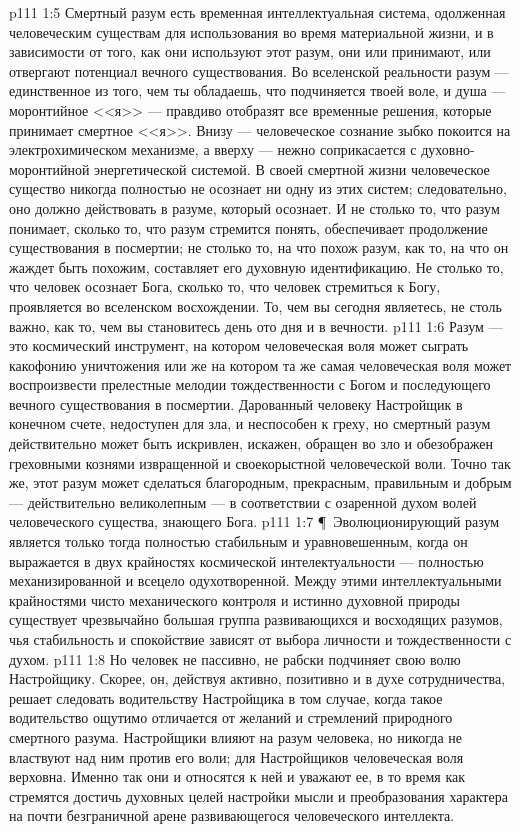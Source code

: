 \vs p111 1:5 Смертный разум есть временная интеллектуальная система, одолженная человеческим существам для использования во время материальной жизни, и в зависимости от того, как они используют этот разум, они или принимают, или отвергают потенциал вечного существования. Во вселенской реальности разум --- единственное из того, чем ты обладаешь, что подчиняется твоей воле, и душа --- моронтийное <<я>> --- правдиво отобразят все временные решения, которые принимает смертное <<я>>. Внизу --- человеческое сознание зыбко покоится на электрохимическом механизме, а вверху --- нежно соприкасается с духовно\hyp{}моронтийной энергетической системой. В своей смертной жизни человеческое существо никогда полностью не осознает ни одну из этих систем; следовательно, оно должно действовать в разуме, который осознает. И не столько то, что разум понимает, сколько то, что разум стремится понять, обеспечивает продолжение существования в посмертии; не столько то, на что похож разум, как то, на что он жаждет быть похожим, составляет его духовную идентификацию. Не столько то, что человек осознает Бога, сколько то, что человек стремиться к Богу, проявляется во вселенском восхождении. То, чем вы сегодня являетесь, не столь важно, как то, чем вы становитесь день ото дня и в вечности.
\vs p111 1:6 Разум --- это космический инструмент, на котором человеческая воля может сыграть какофонию уничтожения или же на котором та же самая человеческая воля может воспроизвести прелестные мелодии тождественности с Богом и последующего вечного существования в посмертии. Дарованный человеку Настройщик в конечном счете, недоступен для зла, и неспособен к греху, но смертный разум действительно может быть искривлен, искажен, обращен во зло и обезображен греховными кознями извращенной и своекорыстной человеческой воли. Точно так же, этот разум может сделаться благородным, прекрасным, правильным и добрым --- действительно великолепным --- в соответствии с озаренной духом волей человеческого существа, знающего Бога.
\vs p111 1:7 \P\ Эволюционирующий разум является только тогда полностью стабильным и уравновешенным, когда он выражается в двух крайностях космической интелектуальности --- полностью механизированной и всецело одухотворенной. Между этими интеллектуальными крайностями чисто механического контроля и истинно духовной природы существует чрезвычайно большая группа развивающихся и восходящих разумов, чья стабильность и спокойствие зависят от выбора личности и тождественности с духом.
\vs p111 1:8 Но человек не пассивно, не рабски подчиняет свою волю Настройщику. Скорее, он, действуя активно, позитивно и в духе сотрудничества, решает следовать водительству Настройщика в том случае, когда такое водительство ощутимо отличается от желаний и стремлений природного смертного разума. Настройщики влияют на разум человека, но никогда не властвуют над ним против его воли; для Настройщиков человеческая воля верховна. Именно так они и относятся к ней и уважают ее, в то время как стремятся достичь духовных целей настройки мысли и преобразования характера на почти безграничной арене развивающегося человеческого интеллекта.
